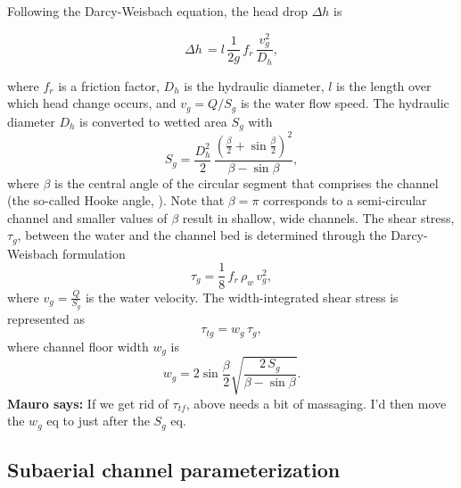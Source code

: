 \documentclass[draft]{agujournal2019}
\newcommand{\mauro}[1]{{\textbf{\color{green}Mauro says:} \color{green} #1} }
\begin{document}
Following the Darcy-Weisbach equation, the head drop $\Delta h$ is
\begin{linenomath*}
  \begin{equation}
    \label{eq:dh}
    \Delta h \,  = l \,\frac{1}{2g} \,f_r\,\frac{v_g^2}{D_h},
  \end{equation}
\end{linenomath*}
\noindent where $f_r$ is a friction factor, $D_h$ is the hydraulic diameter, $l$ is the length over which head change occurs, and $v_g=Q/S_g$ is the water flow speed.
%
The hydraulic diameter $D_h$ is converted to wetted area $S_g$ with
\begin{equation}
  \label{eq:Dh2S}
  S_g= \frac{D_h^2}{2}\,\frac{(\frac{\beta}{2}+\sin \frac{\beta}{2})^2}{\beta - \sin \beta},
\end{equation}
where $\beta$ is the central angle of the circular segment that comprises the channel (the so-called Hooke angle, ). Note that $\beta =\pi$ corresponds to a semi-circular channel and smaller values of $\beta$ result in shallow, wide channels.
%
The shear stress, $\tau_g$, between the water and the channel bed is determined through the Darcy-Weisbach formulation
\begin{equation}
  \label{eq:tau}
  \tau_g=\frac{1}{8}\,f_r\,\rho_w\,v_g^2,
\end{equation}
%
where $v_g = \frac{Q}{S_g}$ is the water velocity.
%
The width-integrated shear stress is represented as
\begin{equation}
  \label{eq:tautg}
  \tau_{tg}=w_g\,\tau_g,
\end{equation}
where  channel floor width $w_g$ is
\begin{equation}
  \label{eq:dh2wc}
  w_g = 2  \sin \frac{\beta}{2} \sqrt{\frac{2\, S_g}{\beta -\sin \beta}}.
\end{equation}
\mauro{If we get rid of $\tau_{tf}$, above needs a bit of massaging.  I'd then move the $w_g$ eq to just after the $S_g$ eq.}

\subsection{Subaerial channel  parameterization}
\label{sect:fluv}
\end{document}
